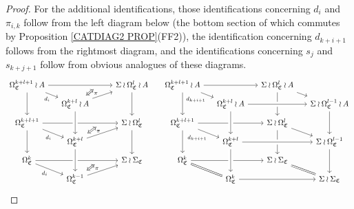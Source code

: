 \documentclass[a4paper,10pt
,draft
]{article}%
\numberwithin{equation}{section}
\numberwithin{figure}{section}
\theoremstyle{definition} %
\newcommand{\1}{\ensuremath{\mathbbm 1}}%
\begin{document}
\begin{proof}
	
	For the additional identifications, 
	those identifications concerning $d_i$ and $\pi_{i,k}$
	follow from the left diagram below 
	(the bottom section of which commutes by 
	Proposition \ref{CATDIAG2 PROP}(FF2)),
	the identification concerning $d_{k+i+1}$ follows from the rightmost diagram, and the identifications concerning 
	$s_j$ and $s_{k+j+1}$
	follow from obvious analogues of these diagrams.
	\[
	\begin{tikzcd}[row sep = 5pt,column sep = 13pt]
	\Omega^{k+l+1}_{\mathfrak{C}} \wr A \ar{rrr}[near end, name=TT,swap]{} \ar{rd}[swap]{d_i} \ar{dd} &&&
	\Sigma \wr \Omega^{l}_{\mathfrak{C}} \wr A \ar{dd}
	&
	\Omega^{k+l+1}_{\mathfrak{C}} \wr A \ar{rr} \ar{rd}[swap]{d_{k+i+1}} \ar{dd} &&
	\Sigma \wr \Omega^{l}_{\mathfrak{C}} \wr A \ar{rd} \ar{dd}
	\\
	&
	|[alias=TD]|
	\Omega^{k+l}_{\mathfrak{C}} \wr A \ar{rru} &&
	&
	&
	\Omega^{k+l}_{\mathfrak{C}} \wr A \arrow[rr, crossing over] &&
	\Sigma \wr \Omega^{l-1}_{\mathfrak{C}} \wr A 	 \ar{dd}
	\\
	\Omega^{k+l+1}_{\mathfrak{C}} \ar{rrr}[near end, name=MT,swap]{} \ar{rd}[swap]{d_i} \ar{dd} &&&
	\Sigma \wr \Omega^{l}_{\mathfrak{C}} \ar{dd}
	&
	\Omega^{k+l+1}_{\mathfrak{C}} \ar{rr} \ar{rd}[swap]{d_{k+i+1}} \ar{dd}&&
	\Sigma \wr \Omega^{l}_{\mathfrak{C}} \ar{rd} \ar{dd}
	\\
	&
	|[alias=MD]|
	\Omega^{k+l}_{\mathfrak{C}} \ar{rru} \arrow[uu, leftarrow, crossing over] &&
	&
	&
	\Omega^{k+l}_{\mathfrak{C}} \arrow[rr, crossing over] \arrow[uu, leftarrow, crossing over] &&
	\Sigma \wr \Omega^{l-1}_{\mathfrak{C}} \ar{dd}
	\\
	\Omega^{k}_{\mathfrak{C}} \ar{rrr}[near end, name=DT,swap]{} \ar{rd}[swap]{d_i} &&&
	\Sigma \wr \Sigma_{\mathfrak{C}}
	&
	\Omega^{k}_{\mathfrak{C}} \ar{rr} \ar[equal]{rd} &&
	\Sigma \wr \Sigma_{\mathfrak{C}} \ar[equal]{rd}
	\\
	&
	|[alias=DD]|
	\Omega^{k-1}_{\mathfrak{C}} \ar{rru} \arrow[uu, leftarrow, crossing over] &&
	&
	&
	\Omega^{k}_{\mathfrak{C}} \ar{rr} \arrow[uu, leftarrow, crossing over] &&
	\Sigma \wr \Sigma_{\mathfrak{C}} 
	\arrow[Leftrightarrow, from=TT, to=TD,shorten >=0.05cm,shorten <=0.05cm, near start,
	"\pi"
	]
	\arrow[Leftrightarrow, from=MT, to=MD,shorten >=0.05cm,shorten <=0.05cm, near start,
	"\pi"
	]
	\arrow[Leftrightarrow, from=DT, to=DD,shorten >=0.05cm,shorten <=0.05cm, near start,
	"\pi"
	]
	\end{tikzcd}
	\]
\end{proof}
\end{document}
